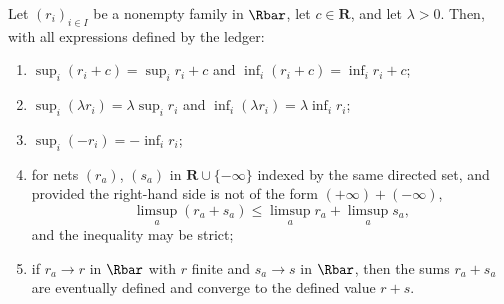 \begin{lemma}
\label{lem:extended-real-safe}
Let $(r_i)_{i\in I}$ be a nonempty family in $\Rbar$, let $c\in\mathbf R$, and
let $\lambda>0$.  Then, with all expressions defined by the ledger:
\begin{enumerate}
\item $\sup_i(r_i+c)=\sup_ir_i+c$ and $\inf_i(r_i+c)=\inf_ir_i+c$;
\item $\sup_i(\lambda r_i)=\lambda\sup_ir_i$ and
  $\inf_i(\lambda r_i)=\lambda\inf_ir_i$;
\item $\sup_i(-r_i)=-\inf_ir_i$;
\item for nets $(r_a)$, $(s_a)$ in $\mathbf R\cup\{-\infty\}$ indexed by the
  same directed set, and provided the right-hand side is not of the form
  $(+\infty)+(-\infty)$,
\[
 \limsup_a(r_a+s_a)\leq\limsup_ar_a+\limsup_as_a ,
\]
  and the inequality may be strict;
\item if $r_a\to r$ in $\Rbar$ with $r$ finite and $s_a\to s$ in $\Rbar$, then
  the sums $r_a+s_a$ are eventually defined and converge to the defined
  value $r+s$.
\end{enumerate}
\par
\end{lemma}

